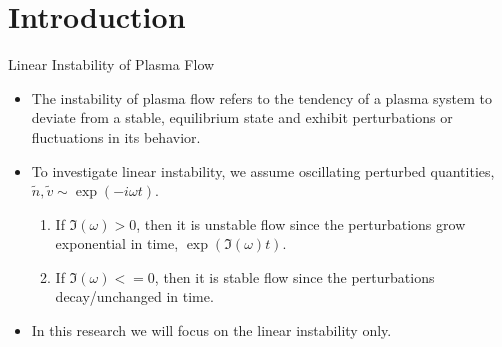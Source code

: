\section{Introduction}
\begin{frame}{Linear Instability of Plasma Flow}
  \begin{itemize}
    \item The instability of plasma flow refers to the tendency of a plasma system to deviate from a stable, equilibrium state and exhibit perturbations or fluctuations in its behavior. \cite{chen_introduction_2016}
    \item To investigate linear instability, we assume oscillating perturbed quantities, $\tilde{n}, \tilde{v} \sim \exp(-i\omega t)$.
    \begin{enumerate}
      \item If $\Im(\omega) > 0$, then it is unstable flow since the perturbations grow exponential in time, $\exp(\Im(\omega) t)$. 
      \item If $\Im(\omega) <=0$, then it is stable flow since the perturbations decay/unchanged in time.
    \end{enumerate}

    \item In this research we will focus on the linear instability only.
  \end{itemize}  
\end{frame}

